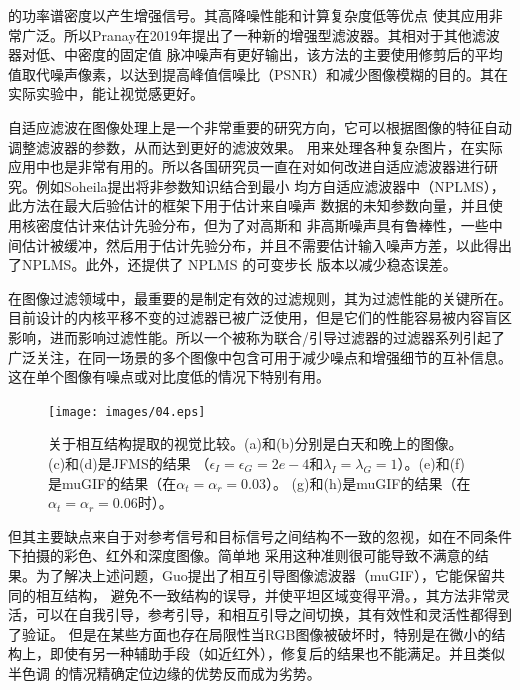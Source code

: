 的功率谱密度以产生增强信号。其高降噪性能和计算复杂度低等优点
使其应用非常广泛。所以Pranay在2019年提出了一种新的增强型滤波器\cite{kumarImageDeNoisingSalt2019}。其相对于其他滤波器对低、中密度的固定值
脉冲噪声有更好输出，该方法的主要使用修剪后的平均值取代噪声像素，以达到提高峰值信噪比（PSNR）和减少图像模糊的目的。其在实际实验中，能让视觉感更好。

自适应滤波在图像处理上是一个非常重要的研究方向，它可以根据图像的特征自动调整滤波器的参数，从而达到更好的滤波效果。
用来处理各种复杂图片，在实际应用中也是非常有用的。所以各国研究员一直在对如何改进自适应滤波器进行研究。例如Soheila提出将非参数知识结合到最小
均方自适应滤波器中（NPLMS）\cite{ashkezari-toussiIncorporatingNonparametricKnowledge2019}，此方法在最大后验估计的框架下用于估计来自噪声
数据的未知参数向量，并且使用核密度估计来估计先验分布，但为了对高斯和
非高斯噪声具有鲁棒性，一些中间估计被缓冲，然后用于估计先验分布，并且不需要估计输入噪声方差，以此得出了NPLMS。此外，还提供了 NPLMS 的可变步长
版本以减少稳态误差。

在图像过滤领域中，最重要的是制定有效的过滤规则，其为过滤性能的关键所在。目前设计的内核平移不变的过滤器已被广泛使用，但是它们的性能容易被内容盲区
影响，进而影响过滤性能。所以一个被称为联合/引导过滤器的过滤器系列引起了广泛关注，在同一场景的多个图像中包含可用于减少噪点和增强细节的互补信息。
这在单个图像有噪点或对比度低的情况下特别有用。

\begin{figure}[htbp]
	\begin{center}
	    \vspace{10pt} %
		\texttt{[image: images/04.eps]}
		\caption{关于相互结构提取的视觉比较。(a)和(b)分别是白天和晚上的图像。(c)和(d)是JFMS的结果
        （$\epsilon_{I}=\epsilon_{G}=2e-4$和$\lambda_{I}=\lambda_{G}=1$）。(e)和(f)是muGIF的结果（在$\alpha_{t}=\alpha_{r}=0.03$）。
        (g)和(h)是muGIF的结果（在$\alpha_{t}=\alpha_{r}=0.06$时）。} 
		\label{04} %
	\end{center}
\end{figure}

但其主要缺点来自于对参考信号和目标信号之间结构不一致的忽视，如在不同条件下拍摄的彩色、红外和深度图像。简单地
采用这种准则很可能导致不满意的结果。为了解决上述问题，Guo提出了相互引导图像滤波器（muGIF）\cite{MutuallyGuided2020}，它能保留共同的相互结构，
避免不一致结构的误导，并使平坦区域变得平滑。，其方法非常灵活，可以在自我引导，参考引导，和相互引导之间切换，其有效性和灵活性都得到了验证。
但是在某些方面也存在局限性当RGB图像被破坏时，特别是在微小的结构上，即使有另一种辅助手段（如近红外），修复后的结果也不能满足。并且类似半色调
的情况精确定位边缘的优势反而成为劣势。

